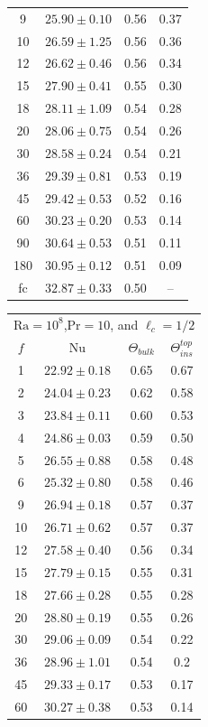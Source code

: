 \documentclass{jfm}
\begin{document}
\begin{center}
\begin{tabular}{cccc}
	9 & $25.90\pm0.10$ & 0.56 & 0.37 \\
	10 & $26.59\pm1.25$ & 0.56 & 0.36 \\
	12 & $26.62\pm0.46$ & 0.56 & 0.34 \\
	15 & $27.90\pm0.41$ & 0.55 & 0.30 \\
	18 & $28.11\pm1.09$ & 0.54 & 0.28 \\
	20 & $28.06\pm0.75$ & 0.54 & 0.26 \\
	30 & $28.58\pm0.24$ & 0.54 & 0.21 \\
	36 & $29.39\pm0.81$ & 0.53 & 0.19 \\
	45 & $29.42\pm0.53$ & 0.52 & 0.16 \\
	60 & $30.23\pm0.20$ & 0.53 & 0.14 \\
	90 & $30.64\pm0.53$ & 0.51 & 0.11 \\
	180 & $30.95\pm0.12$ & 0.51 & 0.09 \\
	fc & $32.87\pm0.33$ & 0.50 & -- \\
\bottomrule
\end{tabular}
\begin{tabular}{cccc}
\toprule
\multicolumn{4}{c}{$\text{Ra}=10^8$,$\text{Pr}=10$, and $\ell_c=1/2$} \\
	$f$ & $\text{Nu}$ & $\Theta_{bulk}$ & $\Theta^{top}_{ins}$ \\
\midrule
	1 & $22.92\pm0.18$ & 0.65 & 0.67 \\
	2 & $24.04\pm0.23$ & 0.62 & 0.58 \\
    3 & $23.84\pm0.11$ & 0.60 & 0.53 \\
    4 & $24.86\pm0.03$ & 0.59 & 0.50 \\
	5 & $26.55\pm0.88$ & 0.58 & 0.48 \\
    6 & $25.32\pm0.80$ & 0.58 & 0.46 \\
	9 & $26.94\pm0.18$ & 0.57 & 0.37 \\
	10 & $26.71\pm0.62$ & 0.57 & 0.37 \\
    12 & $27.58\pm0.40$ & 0.56 & 0.34 \\
	15 & $27.79\pm0.15$ & 0.55 & 0.31 \\
	18 & $27.66\pm0.28$ & 0.55 & 0.28 \\
    20 & $28.80\pm0.19$ & 0.55 & 0.26 \\
	30 & $29.06\pm0.09$ & 0.54 & 0.22 \\
	36 & $28.96\pm1.01$ & 0.54 & 0.2 \\
	45 & $29.33\pm0.17$ & 0.53 & 0.17 \\
	60 & $30.27\pm0.38$ & 0.53 & 0.14 \\

\end{tabular}
\end{center}
\end{document}
